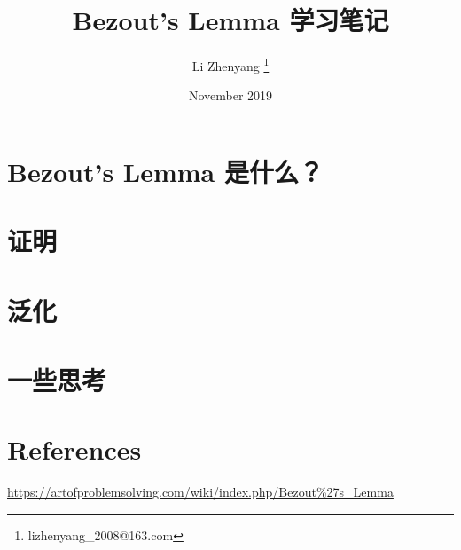 \documentclass{article}
\title{Bezout's Lemma 学习笔记}
\author{Li Zhenyang \thanks{lizhenyang\_2008@163.com}}
\date{November 2019}
\begin{document}
   \maketitle
   \section{Bezout's Lemma 是什么？}
   
   \section{证明}
   \section{泛化}
   \section{一些思考}
   \section{References} 
   \url{https://artofproblemsolving.com/wiki/index.php/Bezout\%27s\_Lemma}
\end{document}
